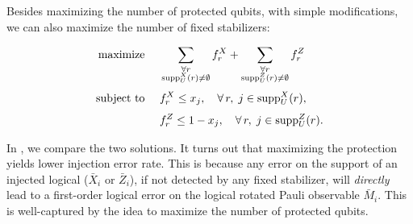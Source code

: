 
Besides maximizing the number of protected qubits,
with simple modifications,
we can also maximize the number of fixed stabilizers:

\begin{equation}
  \begin{aligned}
    \text{maximize } \quad &
      \sum_{\substack{\forall r \\ \mathrm{supp}_U^X(r) \neq \emptyset}} f_r^X
      +
      \sum_{\substack{\forall r \\ \mathrm{supp}_U^Z(r) \neq \emptyset}} f_r^Z
    \\[3pt]
    \text{subject to } \quad &
      f_r^X \le x_j,
      \quad \forall\, r,\; j \in \mathrm{supp}_U^X(r),
    \\[3pt]
    &
      f_r^Z \le 1 - x_j,
      \quad \forall\, r,\; j \in \mathrm{supp}_U^Z(r).
  \end{aligned}
\end{equation}

In ,
we compare the two solutions.
It turns out that maximizing the protection yields lower injection error rate.
This is because any error on the support of an injected logical ($ \bar X_i $ or $ \bar Z_i $),
if not detected by any fixed stabilizer,
will \emph{directly} lead to a first-order logical error on the logical rotated Pauli observable $ \bar M_{i} $.
This is well-captured by the idea to maximize the number of protected qubits.
